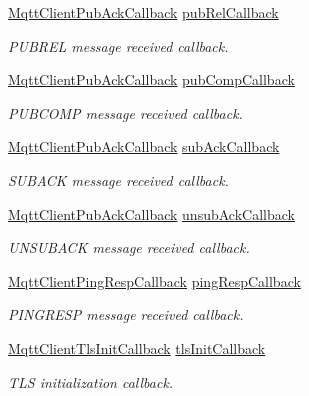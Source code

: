 \begin{DoxyCompactItemize}
\hyperlink{mqtt__client_8h_a795fdcc921902cd871b766c91770a469}{Mqtt\+Client\+Pub\+Ack\+Callback} \hyperlink{structMqttClientCallbacks_a74ba3af4ff2df7cd983b4862c7666f7d}{pub\+Rel\+Callback}
\begin{DoxyCompactList}\small\item\em P\+U\+B\+R\+EL message received callback. \end{DoxyCompactList}\item 
\hyperlink{mqtt__client_8h_a795fdcc921902cd871b766c91770a469}{Mqtt\+Client\+Pub\+Ack\+Callback} \hyperlink{structMqttClientCallbacks_a3ef4a297e0e79521044a956a560a1cb4}{pub\+Comp\+Callback}
\begin{DoxyCompactList}\small\item\em P\+U\+B\+C\+O\+MP message received callback. \end{DoxyCompactList}\item 
\hyperlink{mqtt__client_8h_a795fdcc921902cd871b766c91770a469}{Mqtt\+Client\+Pub\+Ack\+Callback} \hyperlink{structMqttClientCallbacks_abef00851966d05a2dfbf1526ec778d6d}{sub\+Ack\+Callback}
\begin{DoxyCompactList}\small\item\em S\+U\+B\+A\+CK message received callback. \end{DoxyCompactList}\item 
\hyperlink{mqtt__client_8h_a795fdcc921902cd871b766c91770a469}{Mqtt\+Client\+Pub\+Ack\+Callback} \hyperlink{structMqttClientCallbacks_a1d5aabcfb19fef46e5bc90529e086e5c}{unsub\+Ack\+Callback}
\begin{DoxyCompactList}\small\item\em U\+N\+S\+U\+B\+A\+CK message received callback. \end{DoxyCompactList}\item 
\hyperlink{mqtt__client_8h_a534e10d3702515c4a92131c419b92c61}{Mqtt\+Client\+Ping\+Resp\+Callback} \hyperlink{structMqttClientCallbacks_a93a3b81b444cc74fb5410d464b4ee87d}{ping\+Resp\+Callback}
\begin{DoxyCompactList}\small\item\em P\+I\+N\+G\+R\+E\+SP message received callback. \end{DoxyCompactList}\item 
\hyperlink{mqtt__client_8h_ac122290bec99c3ea07b3c1e3e727fa07}{Mqtt\+Client\+Tls\+Init\+Callback} \hyperlink{structMqttClientCallbacks_acb3ae72083fa6a17a54fff91e1556f6a}{tls\+Init\+Callback}
\begin{DoxyCompactList}\small\item\em T\+LS initialization callback. \end{DoxyCompactList}\end{DoxyCompactItemize}


